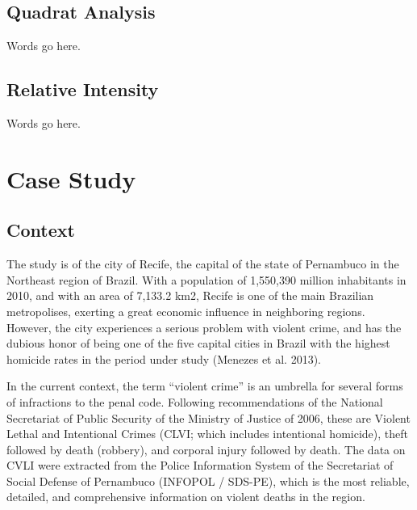 \documentclass[smallextended]{svjour3}       %
\begin{document}
\hypertarget{quadrat-analysis}{%
\subsection{Quadrat Analysis}\label{quadrat-analysis}}

Words go here.

\hypertarget{relative-intensity}{%
\subsection{Relative Intensity}\label{relative-intensity}}

Words go here.

\hypertarget{case}{%
\section{Case Study}\label{case}}

\hypertarget{context}{%
\subsection{Context}\label{context}}

The study is of the city of Recife, the capital of the state of
Pernambuco in the Northeast region of Brazil. With a population of
1,550,390 million inhabitants in 2010, and with an area of 7,133.2 km2,
Recife is one of the main Brazilian metropolises, exerting a great
economic influence in neighboring regions. However, the city experiences
a serious problem with violent crime, and has the dubious honor of being
one of the five capital cities in Brazil with the highest homicide rates
in the period under study (Menezes et al. 2013).

In the current context, the term ``violent crime'' is an umbrella for
several forms of infractions to the penal code. Following
recommendations of the National Secretariat of Public Security of the
Ministry of Justice of 2006, these are Violent Lethal and Intentional
Crimes (CLVI; which includes intentional homicide), theft followed by
death (robbery), and corporal injury followed by death. The data on CVLI
were extracted from the Police Information System of the Secretariat of
Social Defense of Pernambuco (INFOPOL / SDS-PE), which is the most
reliable, detailed, and comprehensive information on violent deaths in
the region.
\end{document}
